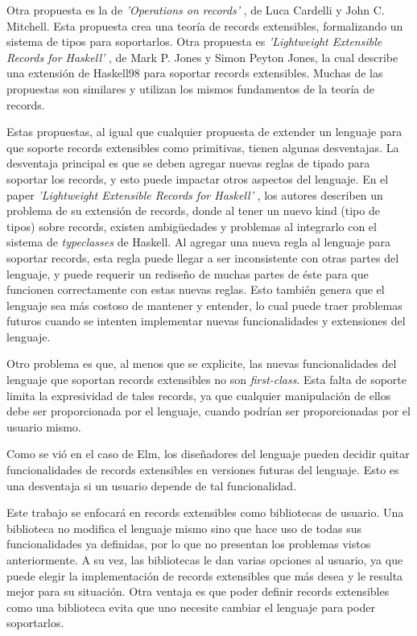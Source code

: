 Otra propuesta es la de \textit{'Operations on records'} \cite{Cardelli:1990:OR:101514.101515}, de Luca Cardelli y John C. Mitchell. Esta propuesta crea una teoría de records extensibles, formalizando un sistema de tipos para soportarlos. Otra propuesta es \textit{'Lightweight Extensible Records for Haskell'} \cite{Jones99lightweightextensible}, de Mark P. Jones y Simon Peyton Jones, la cual describe una extensión de Haskell98 para soportar records extensibles. Muchas de las propuestas son similares y utilizan los mismos fundamentos de la teoría de records.

Estas propuestas, al igual que cualquier propuesta de extender un lenguaje para que soporte records extensibles como primitivas, tienen algunas desventajas. La desventaja principal es que se deben agregar nuevas reglas de tipado para soportar los records, y esto puede impactar otros aspectos del lenguaje. En el paper \textit{'Lightweight Extensible Records for Haskell'} \cite{Jones99lightweightextensible}, los autores describen un problema de su extensión de records, donde al tener un nuevo kind (tipo de tipos) sobre records, existen ambigüedades y problemas al integrarlo con el sistema de \textit{typeclasses} de Haskell. Al agregar una nueva regla al lenguaje para soportar records, esta regla puede llegar a ser inconsistente con otras partes del lenguaje, y puede requerir un rediseño de muchas partes de éste para que funcionen correctamente con estas nuevas reglas. Esto también genera que el lenguaje sea más costoso de mantener y entender, lo cual puede traer problemas futuros cuando se intenten implementar nuevas funcionalidades y extensiones del lenguaje. 

Otro problema es que, al menos que se explicite, las nuevas funcionalidades del lenguaje que soportan records extensibles no son \textit{first-class}. Esta falta de soporte limita la expresividad de tales records, ya que cualquier manipulación de ellos debe ser proporcionada por el lenguaje, cuando podrían ser proporcionadas por el usuario mismo.

Como se vió en el caso de Elm, los diseñadores del lenguaje pueden decidir quitar funcionalidades de records extensibles en versiones futuras del lenguaje. Esto es una desventaja si un usuario depende de tal funcionalidad.

Este trabajo se enfocará en records extensibles como bibliotecas de usuario. Una biblioteca no modifica el lenguaje mismo sino que hace uso de todas sus funcionalidades ya definidas, por lo que no presentan los problemas vistos anteriormente. A su vez, las bibliotecas le dan varias opciones al usuario, ya que puede elegir la implementación de records extensibles que más desea y le resulta mejor para su situación. Otra ventaja es que poder definir records extensibles como una biblioteca evita que uno necesite cambiar el lenguaje para poder soportarlos.

